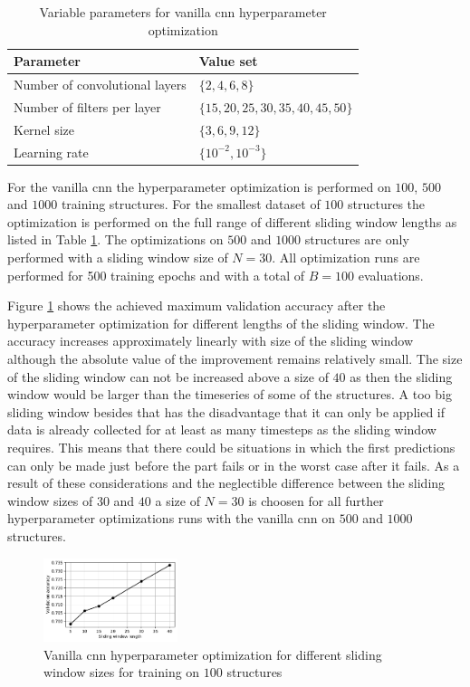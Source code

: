 \documentclass[conference]{IEEEtran}
\begin{document}
\begin{table}[htp]
	\centering
	\caption{Variable parameters for vanilla \gls{cnn} hyperparameter optimization}
	\label{tab:variable_parameters_cnn_optimization}
	\begin{tabular}{ll}
		\textbf{Parameter} & \textbf{Value set} \\
		\hline
		Number of convolutional layers & $ \{2, 4, 6, 8\} $ \\
		Number of filters per layer & $ \{15, 20, 25, 30, 35, 40, 45, 50\} $ \\
		Kernel size & $ \{3, 6, 9, 12\} $ \\
		Learning rate & $ \{10^{-2}, 10^{-3}\} $
	\end{tabular}
\end{table}

For the vanilla \gls{cnn} the hyperparameter optimization is performed on $ 100 $, $ 500 $ and $ 1000 $  training structures. For the smallest dataset of $ 100 $ structures the optimization is performed on the full range of different sliding window lengths as listed in Table \ref{tab:variable_parameters_cnn_optimization}. The optimizations on $ 500 $ and $ 1000 $ structures are only performed with a sliding window size of $ N = 30 $. All optimization runs are performed for 500 training epochs and with a total of $ B = 100 $ evaluations.

Figure \ref{fig:influence_sequence_length_cnn} shows the achieved maximum validation accuracy after the hyperparameter optimization for different lengths of the sliding window. The accuracy increases approximately linearly with size of the sliding window although the absolute value of the improvement remains relatively small. The size of the sliding window can not be increased above a size of $ 40 $ as then the sliding window would be larger than the timeseries of some of the structures. A too big sliding window besides that has the disadvantage that it can only be applied if data is already collected for at least as many timesteps as the sliding window requires. This means that there could be situations in which the first predictions can only be made just before the part fails or in the worst case after it fails. As a result of these considerations and the neglectible difference between the sliding window sizes of $ 30 $ and $ 40 $ a size of $ N = 30 $ is choosen for all further hyperparameter optimizations runs with the vanilla \gls{cnn} on $ 500 $ and $ 1000 $ structures.

\begin{figure}[htp]
	\centering
	\includegraphics[width=0.35\textwidth]{python/influence_sequence_length_cnn.pdf}
	\caption{Vanilla \gls{cnn} hyperparameter optimization for different sliding window sizes for training on $ 100 $ structures}
	\label{fig:influence_sequence_length_cnn}
\end{figure}
\end{document}
